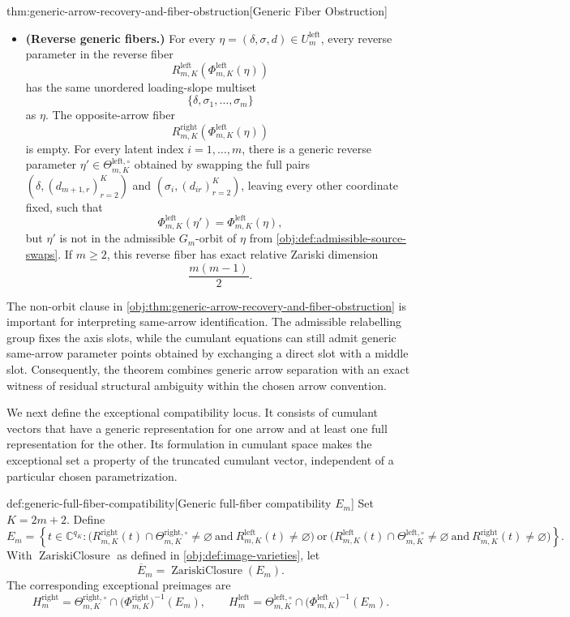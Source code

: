 \documentclass[11pt]{article}
\begin{document}
\begin{theoremv}{thm:generic-arrow-recovery-and-fiber-obstruction}[Generic Fiber Obstruction]
\begin{itemize}
\item \textbf{(Reverse generic fibers.)}  For every \(\eta=(\delta,\sigma,d)\in U^{\mathrm{left}}_m\), every reverse parameter in the reverse fiber
\[
R^{\mathrm{left}}_{m,K}\!\left(\Phi^{\mathrm{left}}_{m,K}(\eta)\right)
\]
has the same unordered loading-slope multiset
\[
\{\delta,\sigma_1,\ldots,\sigma_m\}
\]
as \(\eta\).  The opposite-arrow fiber
\[
R^{\mathrm{right}}_{m,K}\!\left(\Phi^{\mathrm{left}}_{m,K}(\eta)\right)
\]
is empty.  For every latent index \(i=1,\ldots,m\), there is a generic reverse parameter \(\eta'\in\Theta^{\mathrm{left},\circ}_{m,K}\) obtained by swapping the full pairs \((\delta,(d_{m+1,r})_{r=2}^K)\) and \((\sigma_i,(d_{ir})_{r=2}^K)\), leaving every other coordinate fixed, such that
\[
\Phi^{\mathrm{left}}_{m,K}(\eta')
=
\Phi^{\mathrm{left}}_{m,K}(\eta),
\]
but \(\eta'\) is not in the admissible \(G_m\)-orbit of \(\eta\) from \cref{obj:def:admissible-source-swaps}.  If \(m\ge 2\), this reverse fiber has exact relative Zariski dimension
\[
\frac{m(m-1)}{2}.
\]
\end{itemize}
\end{theoremv}

The non-orbit clause in \cref{obj:thm:generic-arrow-recovery-and-fiber-obstruction} is important for interpreting same-arrow identification. The admissible relabelling group fixes the axis slots, while the cumulant equations can still admit generic same-arrow parameter points obtained by exchanging a direct slot with a middle slot. Consequently, the theorem combines generic arrow separation with an exact witness of residual structural ambiguity within the chosen arrow convention.

We next define the exceptional compatibility locus. It consists of cumulant vectors that have a generic representation for one arrow and at least one full representation for the other. Its formulation in cumulant space makes the exceptional set a property of the truncated cumulant vector, independent of a particular chosen parametrization.

\begin{definitionv}{def:generic-full-fiber-compatibility}[Generic full-fiber compatibility \(E_m\)]
Set \(K=2m+2\). Define
\[
E_m
=
\left\{
t\in \mathbb C^{q_K}:
\bigl(R^{\mathrm{right}}_{m,K}(t)\cap \Theta^{\mathrm{right},\circ}_{m,K}\neq\varnothing
\ \text{and}\ 
R^{\mathrm{left}}_{m,K}(t)\neq\varnothing\bigr)
\ \text{or}\
\bigl(R^{\mathrm{left}}_{m,K}(t)\cap \Theta^{\mathrm{left},\circ}_{m,K}\neq\varnothing
\ \text{and}\ 
R^{\mathrm{right}}_{m,K}(t)\neq\varnothing\bigr)
\right\}.
\]
With \(\operatorname{ZariskiClosure}\) as defined in \cref{obj:def:image-varieties}, let
\[
\overline E_m=\operatorname{ZariskiClosure}(E_m).
\]
The corresponding exceptional preimages are
\[
H^{\mathrm{right}}_m
=
\Theta^{\mathrm{right},\circ}_{m,K}
\cap
\bigl(\Phi^{\mathrm{right}}_{m,K}\bigr)^{-1}(E_m),
\qquad
H^{\mathrm{left}}_m
=
\Theta^{\mathrm{left},\circ}_{m,K}
\cap
\bigl(\Phi^{\mathrm{left}}_{m,K}\bigr)^{-1}(E_m).
\]
\end{definitionv}
\end{document}
